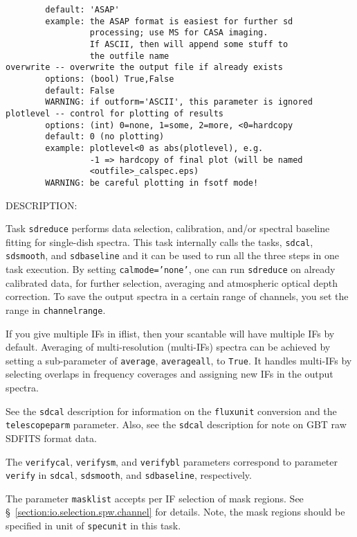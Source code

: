\begin{verbatim}
        default: 'ASAP'
        example: the ASAP format is easiest for further sd
                 processing; use MS for CASA imaging.
                 If ASCII, then will append some stuff to
                 the outfile name
overwrite -- overwrite the output file if already exists
        options: (bool) True,False
        default: False
        WARNING: if outform='ASCII', this parameter is ignored
plotlevel -- control for plotting of results
        options: (int) 0=none, 1=some, 2=more, <0=hardcopy
        default: 0 (no plotting)
        example: plotlevel<0 as abs(plotlevel), e.g.
                 -1 => hardcopy of final plot (will be named
                 <outfile>_calspec.eps)
        WARNING: be careful plotting in fsotf mode!
\end{verbatim}
    
DESCRIPTION:

Task {\tt sdreduce} performs data selection, calibration, and/or spectral
baseline fitting for single-dish spectra. This task internally calls the
tasks, {\tt sdcal}, {\tt sdsmooth}, and {\tt sdbaseline} and it can be used to run all the
three steps in one task execution.
By setting {\tt calmode='none'}, one can run {\tt sdreduce} on already calibrated data,
for further selection, averaging and atmospheric optical depth correction.
To save the output spectra in a certain range of channels, you set the 
range in {\tt channelrange}.

If you give multiple IFs in iflist, then your scantable will have
multiple IFs by default. Averaging of multi-resolution (multi-IFs)
spectra can be achieved by setting a sub-parameter of {\tt average}, 
{\tt averageall}, to {\tt True}. It handles multi-IFs by selecting overlaps in 
frequency coverages and assigning new IFs in the output spectra.

See the {\tt sdcal} description for information on the {\tt fluxunit} 
conversion and the {\tt telescopeparm} parameter.
Also, see the {\tt sdcal} description for note on GBT raw SDFITS format data.

The {\tt verifycal}, {\tt verifysm}, and {\tt verifybl}  parameters correspond to parameter
{\tt  verify} in {\tt sdcal}, {\tt sdsmooth}, and {\tt sdbaseline}, respectively. 
    

The parameter {\tt masklist} accepts per IF selection of mask regions. 
See \S~\ref{section:io.selection.spw.channel} for details. 
Note, the mask regions should be specified in unit of {\tt specunit} 
in this task.




